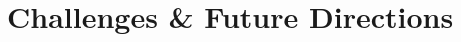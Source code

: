 \documentclass[11pt,a4paper]{article}
\begin{document}





\section{Challenges \& Future Directions} %
\end{document}
